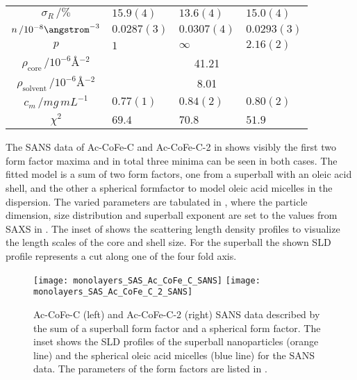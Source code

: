\documentclass[\main/dresen_thesis.tex]{subfiles}
\begin{document}
\begin{table}[!htbp]
\begin{tabular}{ c | l | l | l }
        \rule{0pt}{2ex} $\sigma_R \, / \unit{\%}$                     & $15.9(4)$      & $13.6(4)$  & $15.0(4)$\\
        \rule{0pt}{2ex} $n \, / 10^{-8} \angstrom^{-3}$               & $0.0287(3)$    & $0.0307(4)$& $0.0293(3)$\\
        \rule{0pt}{2ex} $p$                                           & $1$            & $\infty$   & $2.16(2)$\\
        \hline
        \rule{0pt}{2ex} $\rho_\mathrm{core}    \, / \unit{10^{-6} \angstrom^{-2}}$     & \multicolumn{3}{c}{41.21}\\
        \rule{0pt}{2ex} $\rho_\mathrm{solvent} \, / \unit{10^{-6} \angstrom^{-2}}$     & \multicolumn{3}{c}{8.01}\\
        \hline
        \rule{0pt}{2ex} $c_m \, / \unit{mg\, mL^{-1}}$                & $0.77(1)$      & $0.84(2)$  & $0.80(2)$\\
        \hline
        \rule{0pt}{2ex} $\chi^2$                                      & $69.4$         & $70.8$     & $51.9$\\
        \hline
      \end{tabular}
    \end{table}

    The SANS data of Ac-CoFe-C and Ac-CoFe-C-2 in  shows visibly the first two form factor maxima and in total three minima can be seen in both cases.
    The fitted model is a sum of two form factors, one from a superball with an oleic acid shell, and the other a spherical formfactor to model oleic acid micelles in the dispersion.
    The varied parameters are tabulated in , where the particle dimension, size distribution and superball exponent are set to the values from SAXS in .
    The inset of  shows the scattering length density profiles to visualize the length scales of the core and shell size.
    For the superball the shown SLD profile represents a cut along one of the four fold axis.

    \begin{figure}[tb]
      \centering
      \texttt{[image: monolayers\_SAS\_Ac\_CoFe\_C\_SANS]}
      \texttt{[image: monolayers\_SAS\_Ac\_CoFe\_C\_2\_SANS]}
      \caption{\label{fig:monolayers:nanoparticle:sans:superballAcAcFit}Ac-CoFe-C (left) and Ac-CoFe-C-2 (right) SANS data described by the sum of a superball form factor and a spherical form factor. The inset shows the SLD profiles of the superball nanoparticles (orange line) and the spherical oleic acid micelles (blue line) for the SANS data. The parameters of the form factors are listed in .}
    \end{figure}
\end{document}
